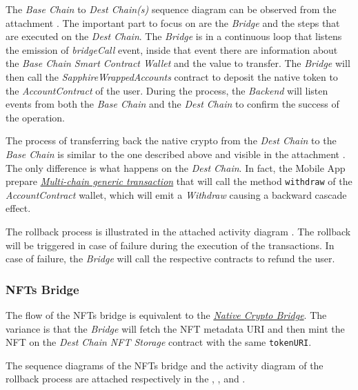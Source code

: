 The \textit{Base Chain} to \textit{Dest Chain(s)} sequence diagram can be observed from the attachment . The important part to focus on are the \textit{Bridge} and the steps that are executed on the \textit{Dest Chain}. The \textit{Bridge} is in a continuous loop that listens the emission of \textit{bridgeCall} event, inside that event there are information about the \textit{Base Chain Smart Contract Wallet} and the value to transfer. The \textit{Bridge} will then call the \textit{SapphireWrappedAccounts} contract to deposit the native token to the \textit{AccountContract} of the user. During the process, the \textit{Backend} will listen events from both the \textit{Base Chain} and the \textit{Dest Chain} to confirm the success of the operation.

The process of transferring back the native crypto from the \textit{Dest Chain} to the \textit{Base Chain} is similar to the one described above and visible in the attachment . The only difference is what happens on the \textit{Dest Chain}. In fact, the Mobile App prepare \hyperref[subsubsec:generic_transactions]{\textit{Multi-chain generic transaction}} that will call the method \texttt{withdraw} of the \textit{AccountContract} wallet, which will emit a \textit{Withdraw} causing a backward cascade effect.

The rollback  process is illustrated in the attached activity diagram . The rollback will be triggered in case of failure during the execution of the transactions. In case of failure, the \textit{Bridge} will call the respective contracts to refund the user.

\subsubsection{NFTs Bridge}

The flow of the NFTs bridge is equivalent to the \hyperref[subsubsec:native_crypto_bridge]{\textit{Native Crypto Bridge}}. The variance is that the \textit{Bridge} will fetch the NFT metadata URI and then mint the NFT on the \textit{Dest Chain NFT Storage} contract with the same \texttt{tokenURI}.

The sequence diagrams of the NFTs bridge and the activity diagram of the rollback process are attached respectively in the , , and .

